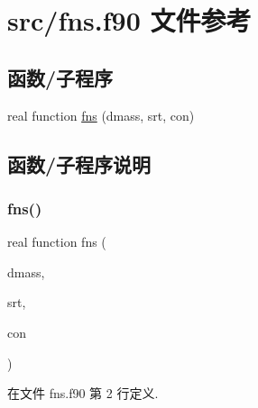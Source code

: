 \hypertarget{fns_8f90}{}\section{src/fns.f90 文件参考}
\label{fns_8f90}
\subsection*{函数/子程序}
\begin{DoxyCompactItemize}
\item 
real function \mbox{\hyperlink{fns_8f90_acb8b677be8ff0a35acfaf255b2cd7efd}{fns}} (dmass, srt, con)
\end{DoxyCompactItemize}


\subsection{函数/子程序说明}
\mbox{\label{fns_8f90_acb8b677be8ff0a35acfaf255b2cd7efd}} 
\subsubsection{\texorpdfstring{fns()}{fns()}}
{\footnotesize\ttfamily real function fns (\begin{DoxyParamCaption}\item[{}]{dmass,  }\item[{}]{srt,  }\item[{}]{con }\end{DoxyParamCaption})}



在文件 fns.\+f90 第 2 行定义.

